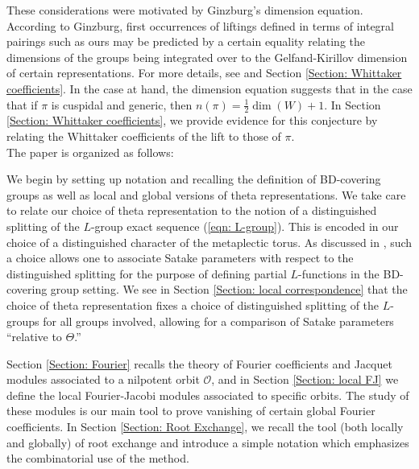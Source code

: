 \documentclass[11pt,reqno]{amsart}
\theoremstyle{definition}
\theoremstyle{remark}
\theoremstyle{definition}
\begin{document}
These considerations were motivated by Ginzburg's dimension equation. According to Ginzburg, first occurrences of liftings defined in terms of integral pairings such as ours may be predicted by a certain equality relating the dimensions of the groups being integrated over to the Gelfand-Kirillov dimension of certain representations. For more details, see \cite{G3} and Section \ref{Section: Whittaker coefficients}. In the case at hand, the dimension equation suggests that in the case that if $\pi$ is cuspidal and generic, then $n(\pi) =\frac{1}{2}\dim(W) +1$. In Section \ref{Section: Whittaker coefficients}, we provide evidence for this conjecture by relating the Whittaker coefficients of the lift to those of $\pi$. \\

\noindent
The paper is organized as follows: 

We begin by setting up notation and recalling the definition of BD-covering groups as well as local and global versions of theta representations. We take care to relate our choice of theta representation to the notion of a distinguished splitting of the $L$-group exact sequence (\ref{eqn: L-group}). This is encoded in our choice of a distinguished character of the metaplectic torus. As discussed in \cite{GG}, such a choice allows one to associate Satake parameters with respect to the distinguished splitting for the purpose of defining partial $L$-functions in the BD-covering group setting. We see in Section \ref{Section: local correspondence} that the choice of theta representation fixes a choice of distinguished splitting of the $L$-groups for all groups involved, allowing for a comparison of Satake parameters ``relative to $\Theta$.''

Section \ref{Section: Fourier} recalls the theory of Fourier coefficients and Jacquet modules associated to a nilpotent orbit ${\mathcal{O}}$, and in Section \ref{Section: local FJ} we define the local Fourier-Jacobi modules associated to specific orbits. The study of these modules is our main tool to prove vanishing of certain global Fourier coefficients. In Section \ref{Section: Root Exchange}, we recall the tool (both locally and globally) of root exchange and introduce a simple notation which emphasizes the combinatorial use of the method.
\end{document}
